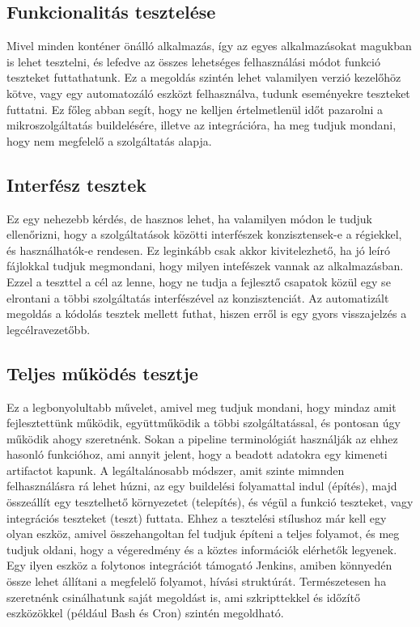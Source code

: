 \documentclass[11pt,magyar,a4paper,twoside,]{report}
\begin{document}
\subsection{Funkcionalitás
tesztelése}\label{funkcionalituxe1s-teszteluxe9se}

Mivel minden konténer önálló alkalmazás, így az egyes alkalmazásokat
magukban is lehet tesztelni, és lefedve az összes lehetséges
felhasználási módot funkció teszteket futtathatunk. Ez a megoldás
szintén lehet valamilyen verzió kezelőhöz kötve, vagy egy automatozáló
eszközt felhasználva, tudunk eseményekre teszteket futtatni. Ez főleg
abban segít, hogy ne kelljen értelmetlenül időt pazarolni a
mikroszolgáltatás buildelésére, illetve az integrációra, ha meg tudjuk
mondani, hogy nem megfelelő a szolgáltatás alapja.

\subsection{Interfész tesztek}\label{interfuxe9sz-tesztek}

Ez egy nehezebb kérdés, de hasznos lehet, ha valamilyen módon le tudjuk
ellenőrizni, hogy a szolgáltatások közötti interfészek konzisztensek-e a
régiekkel, és használhatók-e rendesen. Ez leginkább csak akkor
kivitelezhető, ha jó leíró fájlokkal tudjuk megmondani, hogy milyen
intefészek vannak az alkalmazásban. Ezzel a teszttel a cél az lenne,
hogy ne tudja a fejlesztő csapatok közül egy se elrontani a többi
szolgáltatás interfészével az konzisztenciát. Az automatizált megoldás a
kódolás tesztek mellett futhat, hiszen erről is egy gyors visszajelzés a
legcélravezetőbb.

\subsection{Teljes működés
tesztje}\label{teljes-mux171kuxf6duxe9s-tesztje}

Ez a legbonyolultabb művelet, amivel meg tudjuk mondani, hogy mindaz
amit fejlesztettünk működik, együttműködik a többi szolgáltatással, és
pontosan úgy működik ahogy szeretnénk. Sokan a pipeline terminológiát
használják az ehhez hasonló funkcióhoz, ami annyit jelent, hogy a
beadott adatokra egy kimeneti artifactot kapunk. A legáltalánosabb
módszer, amit szinte mimnden felhasználásra rá lehet húzni, az egy
buildelési folyamattal indul (építés), majd összeállít egy tesztelhető
környezetet (telepítés), és végül a funkció teszteket, vagy integrációs
teszteket (teszt) futtata. Ehhez a tesztelési stílushoz már kell egy
olyan eszköz, amivel összehangoltan fel tudjuk építeni a teljes
folyamot, és meg tudjuk oldani, hogy a végeredmény és a köztes
információk elérhetők legyenek. Egy ilyen eszköz a folytonos integrációt
támogató Jenkins, amiben könnyedén össze lehet állítani a megfelelő
folyamot, hívási struktúrát. Természetesen ha szeretnénk csinálhatunk
saját megoldást is, ami szkripttekkel és időzítő eszközökkel (például
Bash és Cron) szintén megoldható.
\end{document}
